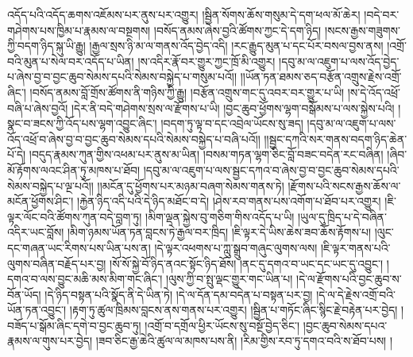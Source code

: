 འདོད་པའི་འདོད་ཆགས་འཇོམས་པར་ནུས་པར་འགྱུར། །སྦྱིན་སོགས་ཆོས་གསུམ་དེ་དག་ཕལ་མོ་ཆེར། །བདེ་བར་གཤེགས་པས་ཁྱིམ་པ་རྣམས་ལ་བསྔགས། །བསོད་ནམས་ཞེས་བྱའི་ཚོགས་ཀྱང་དེ་དག་ཉིད། །སངས་རྒྱས་གཟུགས་ཀྱི་བདག་ཉིད་སྐུ་ཡི་རྒྱུ། །རྒྱལ་སྲས་ཉི་མ་ལ་གནས་འོད་བྱེད་འདི། །རང་རྒྱུད་མུན་པ་དང་པོར་བསལ་བྱས་ནས། །འགྲོ་བའི་མུན་པ་སེལ་བར་འདོད་པ་ཡིན། །ས་འདིར་རྣོ་བར་གྱུར་ཀྱང་ཁྲོ་མི་འགྱུར། །དབུ་མ་ལ་འཇུག་པ་ལས་འོད་བྱེད་པ་ཞེས་བྱ་བ་བྱང་ཆུབ་སེམས་དཔའི་སེམས་བསྐྱེད་པ་གསུམ་པའོ།། །།ཡོན་ཏན་ཐམས་ཅད་བརྩོན་འགྲུས་རྗེས་འགྲོ་ཞིང་། །བསོད་ནམས་བློ་གྲོས་ཚོགས་ནི་གཉིས་ཀྱི་རྒྱུ། །བརྩོན་འགྲུས་གང་དུ་འབར་བར་གྱུར་པ་ཡི། །ས་དེ་འོད་འཕྲོ་བཞི་པ་ཞེས་བྱའོ། །དེར་ནི་བདེ་གཤེགས་སྲས་ལ་རྫོགས་པ་ཡི། །བྱང་ཆུབ་ཕྱོགས་ལྷག་བསྒོམས་པ་ལས་སྐྱེས་པའི། །སྣང་བ་ཟངས་ཀྱི་འོད་པས་ལྷག་འབྱུང་ཞིང་། །བདག་ཏུ་ལྟ་བ་དང་འབྲེལ་ཡོངས་སུ་ཟད། །དབུ་མ་ལ་འཇུག་པ་ལས་འོད་འཕྲོ་བ་ཞེས་བྱ་བ་བྱང་ཆུབ་སེམས་དཔའི་སེམས་བསྐྱེད་པ་བཞི་པའོ།། །།སྦྱང་དཀའི་སར་གནས་བདག་ཉིད་ཆེན་པོ་དེ། །བདུད་རྣམས་ཀུན་གྱིས་འཕམ་པར་ནུས་མ་ཡིན། །བསམ་གཏན་ལྷག་ཅིང་བློ་བཟང་བདེན་རང་བཞིན། །ཞིབ་མོ་རྟོགས་ལའང་ཤིན་ཏུ་མཁས་པ་ཐོབ། །དབུ་མ་ལ་འཇུག་པ་ལས་སྦྱང་དཀའ་བ་ཞེས་བྱ་བ་བྱང་ཆུབ་སེམས་དཔའི་སེམས་བསྐྱེད་པ་ལྔ་པའོ།། །།མངོན་དུ་ཕྱོགས་པར་མཉམ་བཞག་སེམས་གནས་ཏེ། །རྫོགས་པའི་སངས་རྒྱས་ཆོས་ལ་མངོན་ཕྱོགས་ཤིང་། །རྐྱེན་ཉིད་འདི་པའི་དེ་ཉིད་མཐོང་བ་དེ། །ཤེས་རབ་གནས་པས་འགོག་པ་ཐོབ་པར་འགྱུར། །ཇི་ལྟར་ལོང་བའི་ཚོགས་ཀུན་བདེ་བླག་ཏུ། །མིག་ལྡན་སྐྱེས་བུ་གཅིག་གིས་འདོད་པ་ཡི། །ཡུལ་དུ་ཁྲིད་པ་དེ་བཞིན་འདིར་ཡང་བློས། །མིག་ཉམས་ཡོན་ཏན་བླངས་ཏེ་རྒྱལ་བར་ཁྲིད། །ཇི་ལྟར་དེ་ཡིས་ཆེས་ཟབ་ཆོས་རྟོགས་པ། །ལུང་དང་གཞན་ཡང་རིགས་པས་ཡིན་པས་ན། །དེ་ལྟར་འཕགས་པ་ཀླུ་སྒྲུབ་གཞུང་ལུགས་ལས། །ཇི་ལྟར་གནས་པའི་ལུགས་བཞིན་བརྗོད་པར་བྱ། །སོ་སོ་སྐྱེ་བོ་ཉིད་ནའང་སྟོང་ཉིད་ཐོས། །ནང་དུ་དགའ་བ་ཡང་དང་ཡང་དུ་འབྱུང་། །དགའ་བ་ལས་བྱུང་མཆི་མས་མིག་གང་ཞིང་། །ལུས་ཀྱི་བ་སྤུ་ལྡང་གྱུར་གང་ཡིན་པ། །དེ་ལ་རྫོགས་པའི་བྱང་ཆུབ་ས་བོན་ཡོད། །དེ་ཉིད་བསྟན་པའི་སྣོད་ནི་དེ་ཡིན་ཏེ། །དེ་ལ་དོན་དམ་བདེན་པ་བསྟན་པར་བྱ། །དེ་ལ་དེ་རྗེས་འགྲོ་བའི་ཡོན་ཏན་འབྱུང་། །རྟག་ཏུ་ཚུལ་ཁྲིམས་བླངས་ནས་གནས་པར་འགྱུར། །སྦྱིན་པ་གཏོང་ཞིང་སྙིང་རྗེ་བརྟེན་པར་བྱེད། །བཟོད་པ་སྒོམ་ཞིང་དགེ་བ་བྱང་ཆུབ་ཏུ། །འགྲོ་བ་དགྲོལ་ཕྱིར་ཡོངས་སུ་བསྔོ་བྱེད་ཅིང་། །བྱང་ཆུབ་སེམས་དཔའ་རྣམས་ལ་གུས་པར་བྱེད། །ཟབ་ཅིང་རྒྱ་ཆེའི་ཚུལ་ལ་མཁས་པས་ནི། །རིམ་གྱིས་རབ་ཏུ་དགའ་བའི་ས་ཐོབ་པས། །
